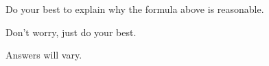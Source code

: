 \documentclass{ximera}
\begin{document}
\begin{problem}
  Do your best to explain why the formula above is reasonable.
  \begin{hint}
    Don't worry, just do your best.
  \end{hint}
  \begin{freeResponse}
    Answers will vary.
  \end{freeResponse}
\end{problem}






\end{document}
